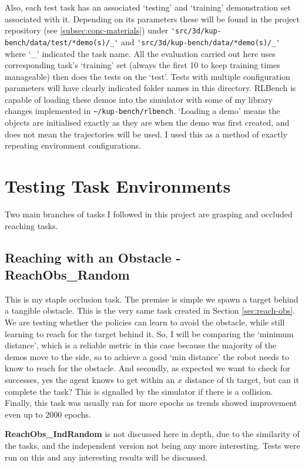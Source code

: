 Also, each test task has an associated `testing' and `training' demonstration set associated with it. Depending on its parameters these will be found in the project repository (see \ref{subsec:conc-materials}) under \verb|'src/3d/kup-bench/data/test/*demo(s)/_'| and \verb|'src/3d/kup-bench/data/*demo(s)/_'| where `\_' indicated the task name. All the evaluation carried out here uses corresponding task's `training' set (always the first 10 to keep training times manageable) then does the tests on the `test'. Tests with multiple configuration parameters will have clearly indicated folder names in this directory. RLBench is capable of loading these demos into the simulator with some of my library changes implemented in \verb|~/kup-bench/rlbench|. `Loading a demo' means the objects are initialised exactly as they are when the demo was first created, and does not mean the trajectories will be used. I used this as a method of exactly repeating environment configurations.

\section{Testing Task Environments}
Two main branches of tasks I followed in this project are grasping and occluded reaching tasks.

\subsection{Reaching with an Obstacle - \textbf{ReachObs\_Random}}\label{eval-setup-reach-obs}
This is my staple occlusion task. The premise is simple we spawn a target behind a tangible obstacle. This is the very same task created in Section \ref{sec:reach-obs}. We are testing whether the policies can learn to avoid the obstacle, while still learning to reach for the target behind it. So, I will be comparing the `minimum distance', which is a reliable metric in this case because the majority of the demos move to the side, so to achieve a good `min distance' the robot needs to know to reach for the obstacle. And secondly, as expected we want to check for successes, yes the agent knows to get within an $x$ distance of th target, but can it complete the task? This is signalled by the simulator if there is a collision. Finally, this task was usually ran for more epochs as trends showed improvement even up to $2000$ epochs.

\textbf{ReachObs\_IndRandom} is not discussed here in depth, due to the similarity of the tasks, and the independent version not being any more interesting. Tests were run on this and any interesting results will be discussed.

